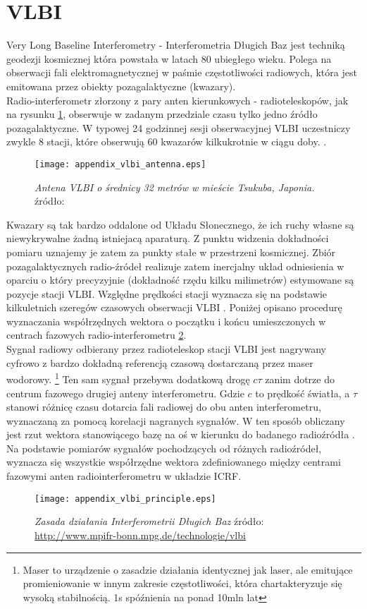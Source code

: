 \section{VLBI}
Very Long Baseline Interferometry - Interferometria Długich Baz jest techniką geodezji kosmicznej która powstała w latach 80 ubiegłego wieku.
Polega na obserwacji fali elektromagnetycznej w paśmie częstotliwości radiowych, która jest emitowana przez obiekty pozagalaktyczne (kwazary).\\
\indent Radio-interferometr złorzony z pary anten kierunkowych - radioteleskopów, jak na rysunku \ref{fig:vlbi_antenna}, obserwuje w zadanym przedziale czasu
tylko jedno źródło pozagalaktyczne. W typowej 24 godzinnej sesji obserwacyjnej VLBI uczestniczy zwykle 8 stacji, które obserwują 60 kwazarów kilkukrotnie w ciągu doby.
\cite[][strona 27]{ggos}.
\begin{figure}[H]
\centering
\texttt{[image: appendix\_vlbi\_antenna.eps]}
\caption{\textit{Antena VLBI o średnicy 32 metrów w mieście Tsukuba, Japonia.} źródło: \cite[][strona 28]{ggos}}
\label{fig:vlbi_antenna}
\end{figure}

\indent Kwazary są tak bardzo oddalone od Układu Słonecznego, że ich ruchy własne są niewykrywalne żadną istniejacą aparaturą. Z punktu widzenia dokładności pomiaru 
uznajemy je zatem za punkty stałe w przestrzeni kosmicznej. Zbiór pozagalaktycznych radio-źródeł realizuje zatem inercjalny układ odniesienia w oparciu o który precyzyjnie
(dokładność rzędu kilku milimetrów) estymowane są pozycje stacji VLBI. Względne prędkości stacji wyznacza się na podstawie kilkuletnich szeregów czasowych obserwacji VLBI 
\cite[][strona 27]{ggos}. Poniżej opisano procedurę wyznaczania współrzędnych wektora o początku i końcu umieszczonych w centrach fazowych radio-interferometru 
\ref{fig:vlbi_principle}.\\
\indent Sygnał radiowy odbierany przez radioteleskop stacji VLBI jest nagrywany cyfrowo z bardzo dokładną referencją czasową dostarczaną przez maser wodorowy. 
\footnote{Maser to urządzenie o zasadzie działania identycznej jak laser, ale emitujące promieniowanie w innym zakresie częstotliwości, która chartakteryzuje się 
wysoką stabilnością. 1s spóźnienia na ponad 10mln lat}
Ten sam sygnał przebywa dodatkową drogę $c\tau$ zanim dotrze do centrum fazowego drugiej anteny interferometru. Gdzie $c$ to prędkość światła, a $\tau$ stanowi 
różnicę czasu dotarcia fali radiowej do obu anten interferometru, wyznaczaną za pomocą korelacji nagranych sygnałów. W ten sposób obliczany jest rzut wektora stanowiącego bazę
na oś w kierunku do badanego radioźródła \cite[][strona 27]{ggos}. 
Na podstawie pomiarów sygnałów pochodzących od różnych radioźródeł, wyznacza się wszystkie współrzędne wektora zdefiniowanego między centrami fazowymi anten 
radiointerferometru w układzie ICRF. 
\begin{figure}[H]
\centering
\texttt{[image: appendix\_vlbi\_principle.eps]}
\caption{\textit{Zasada działania Interferometrii Długich Baz} źródło: \protect\url{http://www.mpifr-bonn.mpg.de/technologie/vlbi}}
\label{fig:vlbi_principle}
\end{figure}



